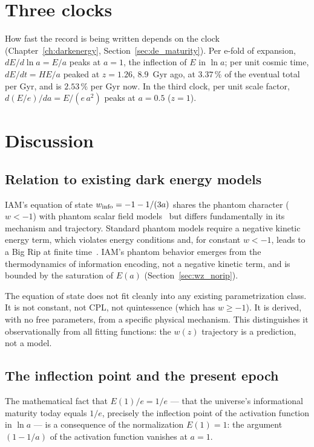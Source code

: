 \section{Three clocks}\label{sec:wz_clocks}
How fast the record is being written depends on the clock (Chapter~\ref{ch:darkenergy}, Section~\ref{sec:de_maturity}). Per e-fold of expansion,
$dE/d\ln a=E/a$ peaks at $a=1$, the inflection of $E$ in $\ln a$; per unit cosmic time, $dE/dt=HE/a$ peaked at $z=1.26$, $8.9$~Gyr ago, at
$3.37\,\%$ of the eventual total per Gyr, and is $2.53\,\%$ per Gyr now. In the third clock, per unit scale factor, $d(E/e)/da=E/(e\,a^2)$ peaks
at $a=0.5$ ($z=1$). \calc

\section{Discussion}
\subsection{Relation to existing dark energy models}\label{sec:wz_models}
IAM's equation of state $w_{\rm info}=-1-1/(3a)$ shares the phantom character ($w<-1$) with phantom scalar field models~\cite{Caldwell2002} but
differs fundamentally in its mechanism and trajectory. Standard phantom models require a negative kinetic energy term, which violates energy
conditions and, for constant $w<-1$, leads to a Big Rip at finite time~\cite{Caldwell2003}. IAM's phantom behavior emerges from the
thermodynamics of information encoding, not a negative kinetic term, and is bounded by the saturation of $E(a)$ (Section~\ref{sec:wz_norip}).
\derived

The equation of state does not fit cleanly into any existing parametrization class. It is not constant, not CPL, not quintessence (which has
$w\ge-1$). It is derived, with no free parameters, from a specific physical mechanism. This distinguishes it observationally from all fitting
functions: the $w(z)$ trajectory is a prediction, not a model. \prediction

\subsection{The inflection point and the present epoch}\label{sec:wz_inflection}
The mathematical fact that $E(1)/e=1/e$ --- that the universe's informational maturity today equals $1/e$, precisely the inflection point of the
activation function in $\ln a$ --- is a consequence of the normalization $E(1)=1$: the argument $(1-1/a)$ of the activation function vanishes at
$a=1$. \derived

